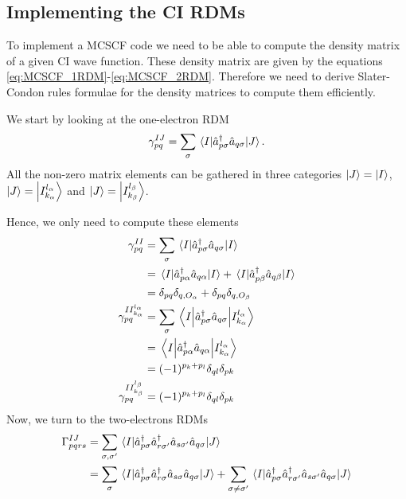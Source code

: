 \documentclass[11pt,a4paper]{article}
\newcommand{\oa}{O_{\alpha}}
\newcommand{\ob}{O_{\beta}}
\begin{document}
\subsection{Implementing the CI RDMs}

To implement a MCSCF code we need to be able to compute the density matrix of a given CI wave function. These density matrix are given by the equations \eqref{eq:MCSCF_1RDM}-\eqref{eq:MCSCF_2RDM}.
Therefore we need to derive Slater-Condon rules formulae for the density matrices to compute them efficiently.

We start by looking at the one-electron RDM
\begin{equation}
  \label{eq:1RDM}
  \gamma_{pq}^{IJ}=\sum_\sigma\mel{I}{\hat{a}_{p\sigma}^\dagger \hat{a}_{q\sigma}}{J}.
\end{equation}
All the non-zero matrix elements can be gathered in three categories $\ket{J}=\ket{I}$, $\ket{J}=\ket{I_{k_\alpha}^{l_\alpha}}$ and $\ket{J}=\ket{I_{k_\beta}^{l_\beta}}$.

Hence, we only need to compute these elements
\begin{subequations}
  \label{eq:1RDM_nonzero}
  \begin{align}
    \gamma_{pq}^{II} &= \sum_\sigma\mel{I}{\hat{a}_{p\sigma}^\dagger \hat{a}_{q\sigma}}{I} \\
                     &= \mel{I}{\hat{a}_{p\alpha}^\dagger \hat{a}_{q\alpha}}{I} + \mel{I}{\hat{a}_{p\beta}^\dagger \hat{a}_{q\beta}}{I} \notag\\
                     &= \delta_{pq} \delta_{q,\oa} + \delta_{pq} \delta_{q,\ob} \notag \\
    \gamma_{pq}^{II_{k_\alpha}^{l_\alpha}} &= \sum_\sigma\mel{I}{\hat{a}_{p\sigma}^\dagger \hat{a}_{q\sigma}}{I_{k_\alpha}^{l_\alpha}} \\
                     &= \mel{I}{\hat{a}_{p\alpha}^\dagger \hat{a}_{q\alpha}}{I_{k_\alpha}^{l_\alpha}} \notag\\
                     &= (-1)^{p_k+p_l} \delta_{ql}\delta_{pk} \notag \\
    \gamma_{pq}^{II_{k_\beta}^{l_\beta}} &= (-1)^{p_k+p_l} \delta_{ql}\delta_{pk}
  \end{align} 
\end{subequations}
Now, we turn to the two-electrons RDMs
\begin{align}
  \label{eq:2RDM}
  \Gamma_{pqrs}^{IJ}&=\sum_{\sigma,\sigma'}\mel{I}{\hat{a}_{p\sigma}^\dagger\hat{a}_{r\sigma'}^\dagger\hat{a}_{s\sigma'}\hat{a}_{q\sigma}}{J} \\
  &= \sum_{\sigma}\mel{I}{\hat{a}_{p\sigma}^\dagger\hat{a}_{r\sigma}^\dagger\hat{a}_{s\sigma}\hat{a}_{q\sigma}}{J} + \sum_{\sigma \neq \sigma'}\mel{I}{\hat{a}_{p\sigma}^\dagger\hat{a}_{r\sigma'}^\dagger\hat{a}_{s\sigma'}\hat{a}_{q\sigma}}{J} \notag
\end{align}
\end{document}
